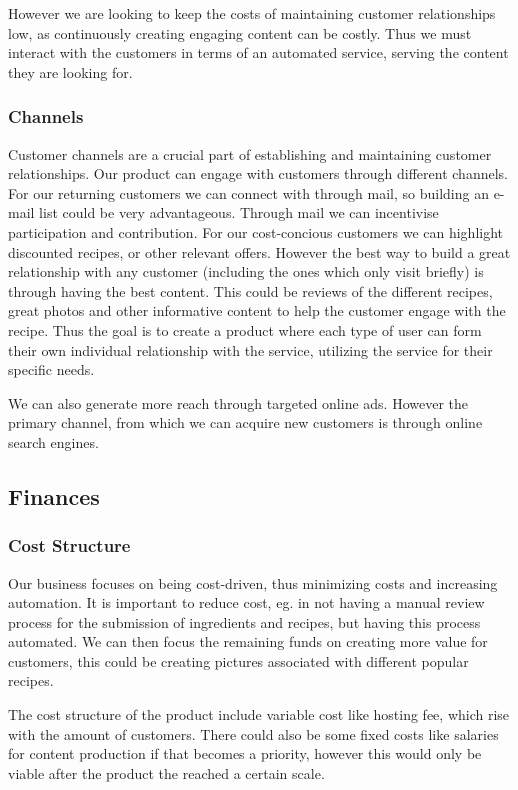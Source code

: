 \documentclass{article}
\begin{document}
However we are looking to keep the costs of maintaining customer relationships low, as
continuously creating engaging content can be costly. Thus we must interact with the
customers in terms of an automated service, serving the content they are looking for.

\subsubsection{Channels}
Customer channels are a crucial part of establishing and maintaining customer
relationships.  Our product can engage with customers through different channels. For our
returning customers we can connect with through mail, so building an e-mail list could be
very advantageous. Through mail we can incentivise participation and contribution. For our
cost-concious customers we can highlight discounted recipes, or other relevant offers.
However the best way to build a great relationship with any customer (including the ones
which only visit briefly)  is through having the best content. This could be reviews of
the different recipes, great photos and other informative content to help the customer
engage with the recipe.  Thus the goal is to create a product where each type of user can
form their own individual relationship with the service, utilizing the service for their
specific needs.

We can also generate more reach through targeted online ads. However the primary channel,
from which we can acquire new customers is through online search engines.

\subsection{Finances}

\subsubsection{Cost Structure}
Our business focuses on being cost-driven, thus minimizing costs and increasing
automation. It is important to reduce cost, eg. in not having a manual review process for
the submission of ingredients and recipes, but having this process automated. We can then
focus the remaining funds on creating more value for customers, this could be creating
pictures associated with different popular recipes.

The cost structure of the product include variable cost like hosting fee, which rise with
the amount of customers. There could also be some fixed costs like salaries for content
production if that becomes a priority, however this would only be viable after the product
the reached a certain scale.
\end{document}
